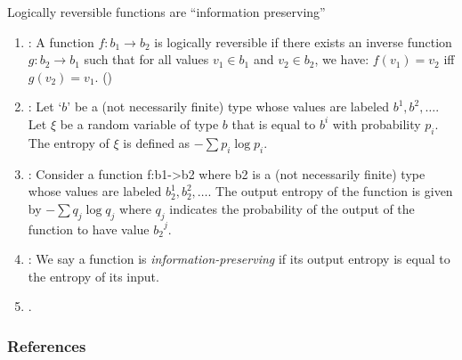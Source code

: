 \documentclass[svgnames,11pt]{beamer}
\newcommand{\red}[1]{{\color{red}{#1}}}
\begin{document}
\begin{frame}{Logically reversible functions are ``information
    preserving''}

\vfill

  \begin{enumerate}


  \item \red{Logical reversibility}: A function $f : b_1 \rightarrow b_2$ is
    logically reversible if there exists an inverse function $g : b_2
    \rightarrow b_1$ such that for all values $v_1 \in b_1$ and $v_2
    \in b_2$, we have: $f(v_1) = v_2$ iff $g(v_2) =
    v_1$. (\cite{Zuliani:2001:LR})

  \item \red{Entropy of a variable} : Let `$b$' be a (not necessarily
    finite) type whose values are labeled $b^1, b^2, \ldots$. Let
    $\xi$ be a random variable of type $b$ that is equal to $b^i$ with
    probability $p_i$. The entropy of $\xi$ is defined as $-\sum p_i
    \log{p_i}$.

  \item \red{Output entropy of a function}: Consider a function
    {{f:b1->b2}} where {{b2}} is a (not necessarily finite) type whose
    values are labeled $b_2^1, b_2^2, \ldots$. The output entropy of
    the function is given by $- \sum q_j \log{q_j}$ where $q_j$
    indicates the probability of the output of the function to have
    value ${b_2}^j$.


  \item \red{Information Preservation}: We say a function is
    \emph{information-preserving} if its output entropy is equal to
    the entropy of its input.

  \item \red{Non-termination is not an observable}.

  \end{enumerate}

\vfill
  
\end{frame}







\begin{frame}
\frametitle{References}
\begin{scriptsize}



\end{scriptsize}
\end{frame}


\end{document}
